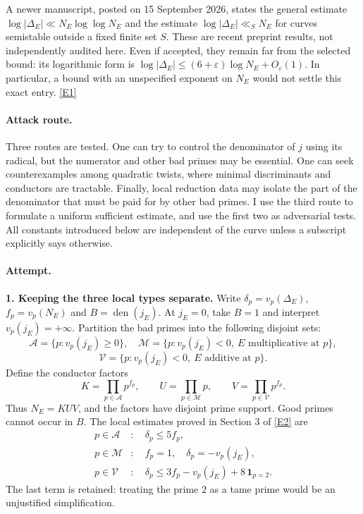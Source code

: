 \documentclass[11pt,a4paper]{article}
\newcommand{\eref}[2]{\hyperlink{extra:#1:#2}{[E#2]}}
\numberwithin{equation}{section}
\begin{document}
A newer manuscript, posted on 15 September 2026, states the general estimate
$\log|\Delta_E|\ll N_E\log\log N_E$ and the estimate
$\log|\Delta_E|\ll_S N_E$ for curves semistable outside a fixed finite set $S$.
These are recent preprint results, not independently audited here. Even if
accepted, they remain far from the selected bound: its logarithmic form is
$\log|\Delta_E|\leq(6+\varepsilon)\log N_E+O_\varepsilon(1)$.
In particular, a bound with an unspecified exponent on $N_E$ would not settle
this exact entry. \eref{9400090}{1}

\paragraph{Attack route.}
Three routes are tested. One can try to control the denominator of $j$ using
its radical, but the numerator and other bad primes may be essential. One
can seek counterexamples among quadratic twists, where minimal discriminants
and conductors are tractable. Finally, local reduction data may isolate the
part of the denominator that must be paid for by other bad primes. I use
the third route to formulate a uniform sufficient estimate, and use the
first two as adversarial tests. All constants introduced below are independent
of the curve unless a subscript explicitly says otherwise.

\paragraph{Attempt.}
\textbf{1. Keeping the three local types separate.}
Write $\delta_p=v_p(\Delta_E)$, $f_p=v_p(N_E)$ and
$B=\operatorname{den}(j_E)$. At $j_E=0$, take $B=1$ and interpret
$v_p(j_E)=+\infty$. Partition the bad primes into the following disjoint sets:
\[
 \mathcal A=\{p:v_p(j_E)\geq0\},\quad
 \mathcal M=\{p:v_p(j_E)<0,\ E\text{ multiplicative at }p\},
\]
\[
 \mathcal V=\{p:v_p(j_E)<0,\ E\text{ additive at }p\}.
\]
Define the conductor factors
\begin{equation}\label{9400090:factors}
 K=\prod_{p\in\mathcal A}p^{f_p},\qquad
 U=\prod_{p\in\mathcal M}p,\qquad
 V=\prod_{p\in\mathcal V}p^{f_p}.
\end{equation}
Thus $N_E=KUV$, and the factors have disjoint prime support. Good primes
cannot occur in $B$. The local estimates proved in Section 3 of
\eref{9400090}{2} are
\begin{align}
 p\in\mathcal A &: \quad\delta_p\leq5f_p,\nonumber\\
 p\in\mathcal M &: \quad f_p=1,\quad\delta_p=-v_p(j_E),\label{9400090:local}\\
 p\in\mathcal V &: \quad
 \delta_p\leq3f_p-v_p(j_E)+8\,\mathbf1_{p=2}.\nonumber
\end{align}
The last term is retained: treating the prime $2$ as a tame prime would be
an unjustified simplification.
\end{document}
